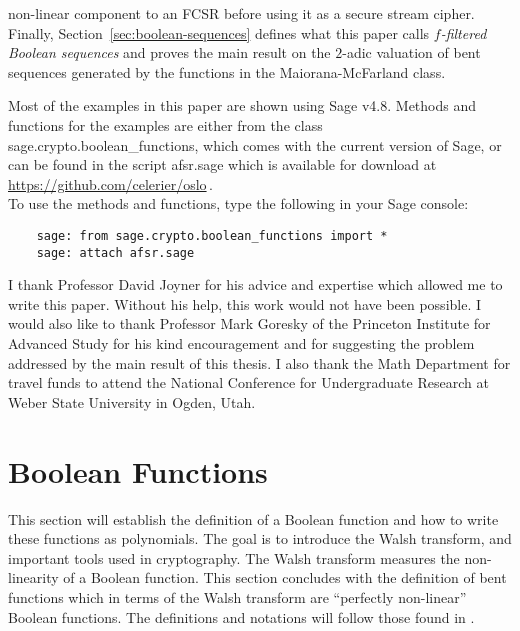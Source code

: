 \documentclass[english]{article}
\theoremstyle{plain}
\theoremstyle{definition}
\theoremstyle{remark}
\begin{document}
non-linear component to an FCSR before using it as a secure stream cipher. Finally,
Section~\ref{sec:boolean-sequences} defines what this paper calls {\it
$f$-filtered Boolean sequences} and proves the main result on the $2$-adic
valuation of bent sequences generated by the functions in the Maiorana-McFarland
class.
\par Most of the examples in this paper are shown using {\ttfamily Sage v4.8}.
Methods and functions for the examples are either from the class {\ttfamily
sage.\allowbreak crypto.\allowbreak boolean\_functions}, which comes with the current version of
{\ttfamily Sage}, or can be found in the script {\ttfamily afsr.sage} which
is available for download at\\
\vskip 0.1mm
\url{https://github.com/celerier/oslo}\,.\\
\vskip 0.1mm
\noindent To use the methods and functions, type the following in your {\ttfamily Sage}
console:
  \begin{lstlisting}
    sage: from sage.crypto.boolean_functions import *
    sage: attach afsr.sage
  \end{lstlisting}

\vskip 0.2in
 I thank Professor David Joyner for his
advice and expertise which allowed me to write this paper. Without his help,
this work would not have been possible. I would also like to thank
Professor Mark Goresky of the Princeton Institute for Advanced Study for
his kind encouragement and for suggesting the problem addressed by the
main result of this thesis. I also thank the Math Department for travel
funds to attend the National Conference for Undergraduate Research at
Weber State University in Ogden, Utah.

\section{Boolean Functions}\label{sec:boolean-functions}
\par This section will establish the definition of a Boolean function
and how to write these functions as polynomials. The goal is to introduce the
Walsh transform, and important tools used in cryptography. The Walsh transform
measures the non-linearity of a Boolean function. This section concludes with
the definition of bent functions which in terms of the Walsh transform are
``perfectly non-linear'' Boolean functions. The definitions and
notations will follow those found in \cite{bk:cs09}.
\end{document}

